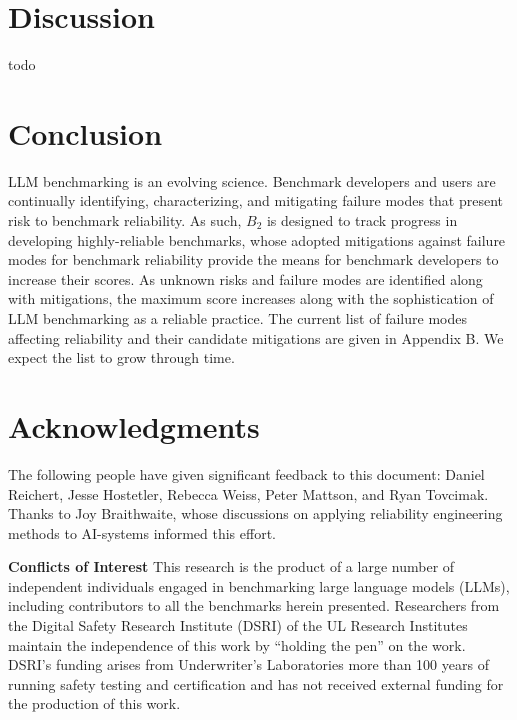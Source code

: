 \documentclass{article}
\newcommand\bb{$B_2$ }
\begin{document}
\section{Discussion}
todo

\section{Conclusion}

LLM benchmarking is an evolving science. Benchmark developers and users are continually identifying, characterizing, and mitigating failure modes that present risk to benchmark reliability. As such, \bb is designed to track progress in developing highly-reliable benchmarks, whose adopted mitigations against failure modes for benchmark reliability provide the means for benchmark developers to increase their scores. As unknown risks and failure modes are identified along with mitigations, the maximum score increases along with the sophistication of LLM benchmarking as a reliable practice. The current list of failure modes affecting reliability and their candidate mitigations are given in Appendix B. We expect the list to grow through time.

\section{Acknowledgments}
The following people have given significant feedback to this document: Daniel Reichert, Jesse Hostetler, Rebecca Weiss, Peter Mattson, and Ryan Tovcimak. Thanks to Joy Braithwaite, whose discussions on applying reliability engineering methods to AI-systems informed this effort.

\begin{center}
    \begin{tcolorbox}[colback=blue!10, colframe=blue!50, width=\textwidth, boxrule=0.5mm, sharp corners, coltext=black, halign=left]
        \textbf{Conflicts of Interest}
This research is the product of a large number of independent individuals engaged in benchmarking large language models (LLMs), including contributors to all the benchmarks herein presented. Researchers from the Digital Safety Research Institute (DSRI) of the UL Research Institutes maintain the independence of this work by ``holding the pen'' on the work. DSRI's funding arises from Underwriter's Laboratories more than 100 years of running safety testing and certification and has not received external funding for the production of this work.
\end{tcolorbox}
\end{center}





\appendix 





\end{document}
